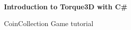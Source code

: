 \cleardoublepage
\begin{titlepage}
	{\centering
		\vspace{3cm}
		{\Huge\sffamily\bfseries Introduction to Torque3D with C\# \par} \vspace{0.5cm}}
	
	
	\noindent
	{\Large\ttfamily CoinCollection Game tutorial \par}
	
	
\end{titlepage}

%